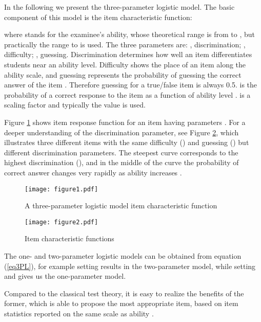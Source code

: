 \documentclass[11pt,twoside]{article}
\begin{document}
In the following we present the three-parameter logistic model. The basic component of this model is the item characteristic function:
 
where  stands for the examinee's ability, whose theoretical range is from   to  , but practically the range  to  is used. The three parameters are: , discrimination; , difficulty; ,  guessing.  Discrimination determines how well an item differentiates students near an ability level. Difficulty shows the place of an item along the ability scale, and guessing represents the probability of guessing the correct answer of the item \cite{BAKER}. Therefore guessing for a true/false item is always 0.5.   is the probability of a correct response to the item  as a function of ability level \cite{HAMBLETON}.   is a scaling factor and typically the value  is used. 
  
Figure \ref{IRF} shows item response function for an item having parameters .
For a deeper understanding of the discrimination parameter, see Figure \ref{ability3}, which illustrates three different items with the same difficulty () and guessing () but different discrimination parameters. The steepest curve corresponds to the highest discrimination (), and in the middle of the curve the probability of correct answer changes very rapidly as ability increases \cite{BAKER}. 

\begin{figure}[t]
\begin{center}\texttt{[image: figure1.pdf]}\end{center}
\caption{\label{IRF}A three-parameter logistic model item characteristic function} 
\end{figure}

\begin{figure}[t]
\begin{center}\texttt{[image: figure2.pdf]}\end{center}
\caption{\label{ability3}Item characteristic functions} 
\end{figure}

The one- and two-parameter logistic models can be obtained from equation (\ref{eq3PL}), for example setting   results in the two-parameter model, while setting  and  gives us the one-parameter model.

Compared to the classical test theory, it is easy to realize the benefits of the former, which is able to propose the most appropriate item, based on item statistics reported on the same scale as ability \cite{HAMBLETON}. 
\end{document}
